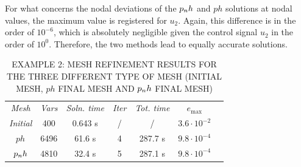 For what concerns the nodal deviations of the $p_{n}h$ and $ph$ solutions at nodal values, the maximum value is registered for $u_2$. Again, this difference is in the order of $10^{-6}$, which is absolutely negligible given the control signal $u_2$ in the order of $10^0$. Therefore, the two methods lead to equally accurate solutions.
\begin{table}[t]
	\caption{EXAMPLE 2: MESH REFINEMENT RESULTS FOR THE THREE DIFFERENT TYPE OF MESH (INITIAL MESH, $ph$ FINAL MESH AND $p_{n}h$ FINAL MESH)}
	\begin{center}
		\label{tab:tabledisk}
		\begin{tabular}{c c c c c c c}
			& & \\ %
			\hline
			\emph{Mesh} & \emph{Vars} & \emph{Soln. time} & \emph{Iter} & \emph{Tot. time} & $e_\text{max}$ \\
			\hline
			\emph{Initial} & 400 & 0.643 s & / & / &  $3.6\cdot 10^{-2}$\\
			$ph$  & 6496 & 61.6 s & 4 & 287.7 s & $9.8\cdot 10^{-4}$ \\
			$p_{n}h$ & 4810 & 32.4 s & 5 & 287.1 s & $9.8\cdot 10^{-4}$ \\
			\hline
		\end{tabular}
	\end{center}
\end{table}
